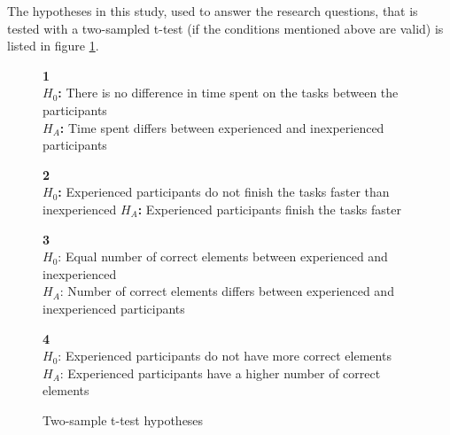 
The hypotheses in this study, used to answer the research questions, that is tested with a two-sampled t-test (if the conditions mentioned above are valid) is listed in figure \ref{fig:hypothesis_ttest}. 

\begin{figure}[H]
	\begin{framed}\centering
		\textbf{1}\\
		\textbf{$H_{0}$:} There is no difference in time spent on the tasks between the participants\\
		\textbf{$H_{A}$:} Time spent differs between experienced and inexperienced participants \newline
		
		\textbf{2}\\
		\textbf{$H_{0}$:} Experienced participants do not finish the tasks faster than inexperienced\newline
		\textbf{$H_{A}$:} Experienced participants finish the tasks faster\newline
		
		\textbf{3}\\
		$H_{0}$: Equal number of correct elements between experienced and inexperienced \\
		$H_{A}$: Number of correct elements differs between experienced and inexperienced participants\newline
		
		\textbf{4}\\
		$H_{0}$: Experienced participants do not have more correct elements\\
		$H_{A}$: Experienced participants have a higher number of correct elements\newline
	\end{framed}
	\caption{Two-sample t-test hypotheses}
	\label{fig:hypothesis_ttest}
\end{figure}

